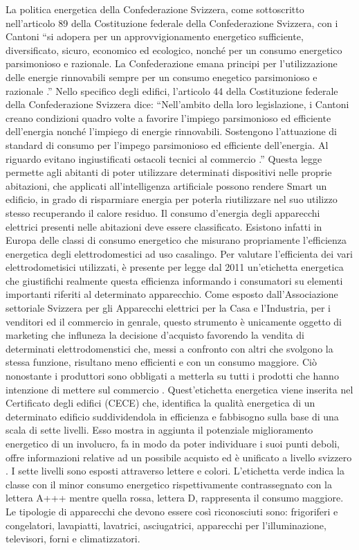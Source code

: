 La politica energetica della Confederazione Svizzera, come sottoscritto nell’articolo 89 della Costituzione federale della Confederazione Svizzera, con i Cantoni “si adopera per un approvvigionamento energetico sufficiente, diversificato, sicuro, economico ed ecologico, nonché per un consumo energetico parsimonioso e razionale. La Confederazione emana principi per l’utilizzazione delle energie rinnovabili sempre per un consumo enegetico parsimonioso e razionale .”
Nello specifico degli edifici, l’articolo 44 della Costituzione federale della Confederazione Svizzera dice: “Nell’ambito della loro legislazione, i Cantoni creano condizioni quadro volte a favorire l’impiego parsimonioso ed efficiente dell’energia nonché l’impiego di energie rinnovabili. Sostengono l’attuazione di standard di consumo per l’impego parsimonioso ed efficiente dell’energia. Al riguardo evitano ingiustificati ostacoli tecnici al commercio .” 
Questa legge permette agli abitanti di poter utilizzare determinati dispositivi nelle proprie abitazioni, che applicati all’intelligenza artificiale possono rendere Smart un edificio, in grado di risparmiare energia per poterla riutilizzare nel suo utilizzo stesso recuperando il calore residuo.
Il consumo d’energia degli apparecchi elettrici presenti nelle abitazioni deve essere classificato. Esistono infatti in Europa delle classi di consumo energetico che misurano propriamente l’efficienza energetica degli elettrodomestici ad uso casalingo.
Per valutare l’efficienta dei vari elettrodometisici utilizzati, è presente per legge dal 2011 un’etichetta energetica che giustifichi realmente questa efficienza informando i consumatori su elementi importanti riferiti al determinato apparecchio. Come esposto dall’Associazione settoriale Svizzera per gli Apparecchi elettrici per la Casa e l’Industria, per i venditori ed il commercio in genrale, questo strumento è unicamente oggetto di marketing che influneza la decisione   d’acquisto favorendo la vendita di determinati elettrodomenstici che, messi a confronto con altri che svolgono la stessa funzione, risultano meno efficienti e con un consumo maggiore. Ciò nonostante i produttori sono obbligati a metterla su tutti i prodotti che hanno intenzione di mettere sul commercio .
Quest’etichetta energetica viene inserita nel Certificato degli edifici (CECE) che, identifica la qualità energetica di un determinato edificio suddividendola in efficienza e fabbisogno sulla base di una scala di sette livelli. Esso mostra in aggiunta il potenziale miglioramento energetico di un involucro, fa in modo da poter individuare i suoi punti deboli, offre informazioni relative ad un possibile acquisto ed è unificato a livello svizzero . 
I sette livelli sono esposti attraverso lettere e colori. L’etichetta verde indica la classe con il minor consumo energetico rispettivamente contrassegnato con la lettera A+++ mentre quella rossa, lettera D, rappresenta il consumo maggiore. Le tipologie di apparecchi che devono essere così riconosciuti sono: frigoriferi e congelatori, lavapiatti, lavatrici, asciugatrici, apparecchi per l’illuminazione, televisori, forni e climatizzatori. 
